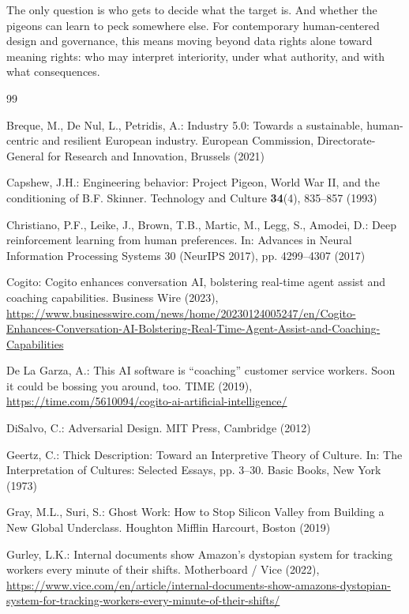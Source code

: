 \documentclass[runningheads]{llncs}
\begin{document}
The only question is who gets to decide what the target is. And whether the pigeons can learn to peck somewhere else. For contemporary human-centered design and governance, this means moving beyond data rights alone toward meaning rights: who may interpret interiority, under what authority, and with what consequences.

\begin{thebibliography}{99}

Breque, M., De Nul, L., Petridis, A.: Industry 5.0: Towards a sustainable, human-centric and resilient European industry. European Commission, Directorate-General for Research and Innovation, Brussels (2021)

Capshew, J.H.: Engineering behavior: Project Pigeon, World War II, and the conditioning of B.F. Skinner. Technology and Culture \textbf{34}(4), 835--857 (1993)

Christiano, P.F., Leike, J., Brown, T.B., Martic, M., Legg, S., Amodei, D.: Deep reinforcement learning from human preferences. In: Advances in Neural Information Processing Systems 30 (NeurIPS 2017), pp. 4299--4307 (2017)

Cogito: Cogito enhances conversation AI, bolstering real-time agent assist and coaching capabilities. Business Wire (2023), \url{https://www.businesswire.com/news/home/20230124005247/en/Cogito-Enhances-Conversation-AI-Bolstering-Real-Time-Agent-Assist-and-Coaching-Capabilities}

De La Garza, A.: This AI software is ``coaching'' customer service workers. Soon it could be bossing you around, too. TIME (2019), \url{https://time.com/5610094/cogito-ai-artificial-intelligence/}

DiSalvo, C.: Adversarial Design. MIT Press, Cambridge (2012)

Geertz, C.: Thick Description: Toward an Interpretive Theory of Culture. In: The Interpretation of Cultures: Selected Essays, pp. 3--30. Basic Books, New York (1973)

Gray, M.L., Suri, S.: Ghost Work: How to Stop Silicon Valley from Building a New Global Underclass. Houghton Mifflin Harcourt, Boston (2019)

Gurley, L.K.: Internal documents show Amazon's dystopian system for tracking workers every minute of their shifts. Motherboard / Vice (2022), \url{https://www.vice.com/en/article/internal-documents-show-amazons-dystopian-system-for-tracking-workers-every-minute-of-their-shifts/}


\end{thebibliography}
\end{document}
